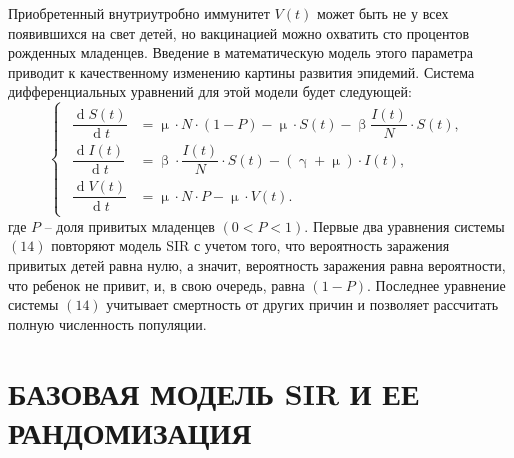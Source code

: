 \documentclass[a4paper, 12pt]{extarticle}
\numberwithin{equation}{section}
\renewcommand{\beta}{\upbeta}
\renewcommand{\gamma}{\upgamma}
\renewcommand{\mu}{\upmu}
\renewcommand{\d}{\operatorname{d}}
\begin{document}
	Приобретенный внутриутробно иммунитет $V(t)$ может быть не у всех появившихся на свет детей, но вакцинацией можно охватить сто процентов рожденных младенцев. Введение в математическую модель этого параметра приводит к качественному изменению картины развития эпидемий. Система дифференциальных уравнений для этой модели будет следующей:
	\begin{equation}
		\left\{ 
		\begin{gathered} 
			\begin{aligned}
				\dfrac {\d S(t)}{\d t} &= \mu \cdot N\cdot (1-P) - \mu \cdot S(t) - \beta \dfrac{I(t)}{N}\cdot S(t),\\
				\dfrac{\d I(t)}{\d t} &=\beta \cdot \dfrac{I(t)}{N}\cdot S(t) - (\gamma + \mu)\cdot I(t),\\
				\dfrac{\d V(t)}{\d t} &= \mu \cdot N \cdot P - \mu \cdot V(t). 
			\end{aligned}
		\end{gathered} 
		\right.
	\end{equation}
	где $P$ -- доля привитых младенцев $( 0 < P < 1 )$. Первые два уравнения системы $(14)$ повторяют модель SIR с учетом того, что вероятность заражения привитых детей равна нулю, а значит, вероятность заражения равна вероятности, что ребенок не привит, и, в свою очередь, равна $(1 - P)$. Последнее уравнение системы $(14)$ учитывает смертность от других причин и позволяет рассчитать полную численность популяции.
	\newpage
	\section{БАЗОВАЯ МОДЕЛЬ SIR И ЕЕ РАНДОМИЗАЦИЯ}
\end{document}
